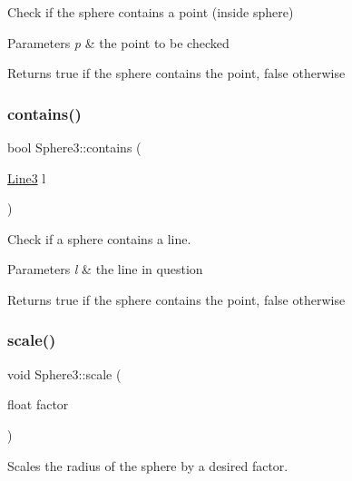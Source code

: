 Check if the sphere contains a point (inside sphere) 


\begin{DoxyParams}{Parameters}
{\em p} & the point to be checked \\
\hline
\end{DoxyParams}
\begin{DoxyReturn}{Returns}
true if the sphere contains the point, false otherwise 
\end{DoxyReturn}
\mbox{\label{class_sphere3_aa03cfcb0166fa5a928b07e1ef1c2a9b5}} 
\subsubsection{\texorpdfstring{contains()}{contains()}\hspace{0.1cm}{\footnotesize\ttfamily [2/2]}}
{\footnotesize\ttfamily bool Sphere3\+::contains (\begin{DoxyParamCaption}\item[{\mbox{\hyperlink{class_line3}{Line3}}}]{l }\end{DoxyParamCaption})}



Check if a sphere contains a line. 


\begin{DoxyParams}{Parameters}
{\em l} & the line in question \\
\hline
\end{DoxyParams}
\begin{DoxyReturn}{Returns}
true if the sphere contains the point, false otherwise 
\end{DoxyReturn}
\mbox{\label{class_sphere3_a1662d09d54495302fd96dd888961a706}} 
\subsubsection{\texorpdfstring{scale()}{scale()}}
{\footnotesize\ttfamily void Sphere3\+::scale (\begin{DoxyParamCaption}\item[{float}]{factor }\end{DoxyParamCaption})}



Scales the radius of the sphere by a desired factor. 


